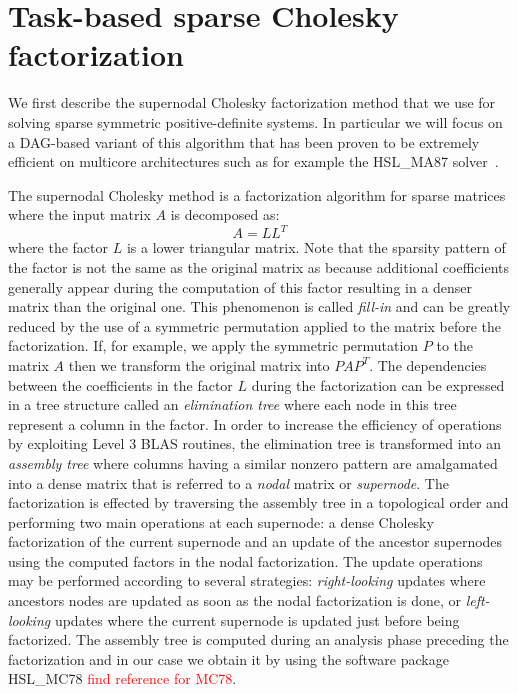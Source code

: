 \documentclass{article}
\newcommand{\alert}[1]{\textcolor{red}{#1}\xspace}
\newcommand{\ma}{HSL\_MA87\xspace}
\begin{document}
\section{Task-based sparse Cholesky factorization}\label{sec:chol}
\setcounter{equation}{0}
\setcounter{table}{0}
\setcounter{figure}{0}

We first describe the supernodal Cholesky factorization method that we
use for solving sparse symmetric positive-definite systems. In
particular we will focus on a DAG-based variant of this algorithm that
has been proven to be extremely efficient on multicore architectures
such as for example the \ma solver~\cite{h.r.s:10}.

The supernodal Cholesky method is a factorization algorithm for sparse
matrices where the input matrix $A$ is decomposed as:
\begin{equation}\label{eq:chol}
  A = LL^{T}
\end{equation}
where the factor $L$ is a lower triangular matrix. Note that the
sparsity pattern of the factor is not the same as the original matrix
as because additional coefficients generally appear during the
computation of this factor resulting in a denser matrix than the
original one. This phenomenon is called \textit{fill-in} and can be
greatly reduced by the use of a symmetric permutation applied to the
matrix before the factorization. If, for example, we apply the
symmetric permutation $P$ to the matrix $A$ then we transform the
original matrix into $PAP^{T}$. The dependencies between the
coefficients in the factor $L$ during the factorization can be
expressed in a tree structure called an \textit{elimination tree}
where each node in this tree represent a column in the factor. In
order to increase the efficiency of operations by exploiting Level 3
BLAS routines, the elimination tree is transformed into an
\textit{assembly tree} where columns having a similar nonzero pattern
are amalgamated into a dense matrix that is referred to a
\textit{nodal} matrix or \textit{supernode}. The factorization is
effected by traversing the assembly tree in a topological order and
performing two main operations at each supernode: a dense Cholesky
factorization of the current supernode and an update of the ancestor
supernodes using the computed factors in the nodal factorization. The
update operations may be performed according to several strategies:
\textit{right-looking} updates where ancestors nodes are updated as
soon as the nodal factorization is done, or \textit{left-looking}
updates where the current supernode is updated just before being
factorized. The assembly tree is computed during an analysis phase
preceding the factorization and in our case we obtain it by using the
software package HSL\_MC78 \alert{find reference for MC78}.
\end{document}
